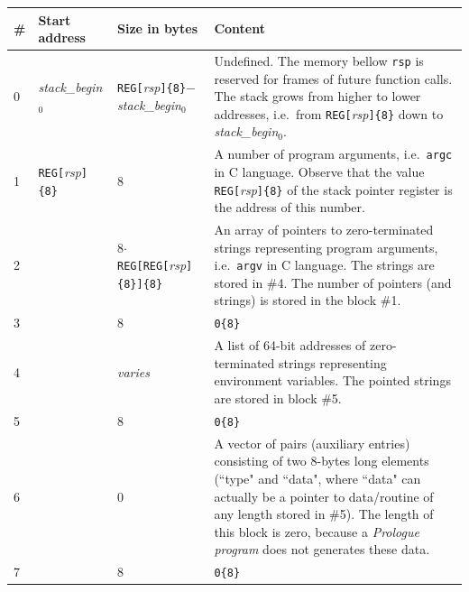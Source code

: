 \documentclass[10pt,twocolumn]{article}
\begin{document}
\begin{table}[!h]
\begin{center}
\def\arraystretch{1}
\begin{tabular}{l||p{3.5cm}|p{3.5cm}|p{7cm}}
\textbf{\#} &
\textbf{Start address} &
\textbf{Size in bytes} &
\textbf{Content} \\
\hline\hline

0 %
& \textit{stack\_begin}$ _0 $ %
& \texttt{REG[}\textit{rsp}\texttt{]\{8\}}$ - $ \textit{stack\_begin}$ _0 $ %
& Undefined. The memory bellow \texttt{rsp} is reserved for frames of future
function calls. The stack grows from higher to lower addresses, i.e.~from
\texttt{REG[}\textit{rsp}\texttt{]\{8\}} down to \textit{stack\_begin}$ _0 $. %
\\ \hline

1 %
& \texttt{REG[}\textit{rsp}\texttt{]\{8\}} %
& 8 %
& A number of program arguments, i.e.~\texttt{argc} in C language. Observe that
the value \texttt{REG[}\textit{rsp}\texttt{]\{8\}} of the stack pointer register
is the address of this number. %
\\ \hline

2 %
& %
& 8$ \cdot $\texttt{REG[REG[}\textit{rsp}\texttt{]\{8\}]\{8\}} %
& An array of pointers to zero-terminated strings representing program
arguments, i.e.~\texttt{argv} in C language. The strings are stored in \#4. The
number of pointers (and strings) is stored in the block \#1.%
\\ \hline

3 %
&
& 8 %
& \texttt{0\{8\}}
\\ \hline

4 %
& 
& \textit{varies} %
& A list of 64-bit addresses of zero-terminated strings representing environment
variables. The pointed strings are stored in block \#5. \\ \hline

5 %
&
& 8 %
& \texttt{0\{8\}}
\\ \hline

6 %
& %
& 0 %
& A vector of pairs (auxiliary entries) consisting of two 8-bytes long elements
(``type" and ``data", where ``data" can actually be a pointer to data/routine of
any length stored in \#5). The length of this block is zero, because a
\textit{Prologue program} does not generates these data. \\ \hline

7 %
&
& 8 %
& \texttt{0\{8\}}
\\ \hline


\end{tabular}
\end{center}
\end{table}
\end{document}
